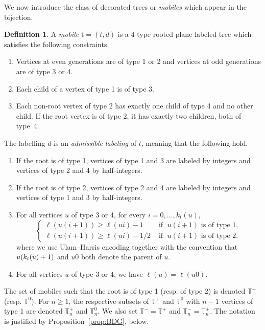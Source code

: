 \documentclass[10pt]{amsart}
\theoremstyle{definition}\newtheorem{defi}[theo]{Definition}\newtheorem{rema}[theo]{Remark}\newtheorem{exam}[theo]{Example}\newtheorem{exem}[theo]{Example}\newtheorem{nota}[theo]{Notation}
\newcommand{\bbT}{\mathbb{T}}
\newcommand{\rt}{\mathrm{t}}
\newcommand*{\romanenumi}{\renewcommand*{\theenumi}{\roman{enumi}}}
\begin{document}
We now introduce the class of decorated trees or \emph{mobiles} which appear in the bijection.

\begin{defi}\label{def:mobiles}
A \emph{mobile} $\rt=(t,d)$ is a 4-type rooted plane labeled tree which satisfies the following constraints.
\begin{enumerate}\romanenumi
\item \label{defi4.2.i} Vertices at even generations are of type 1 or 2 and vertices at odd generations are of type 3 or 4.
\item \label{defi4.2.ii} Each child of a vertex of type 1 is of type 3.
\item \label{defi4.2.iii} Each non-root vertex of type 2 has exactly one child of type 4 and no other child. If the root vertex is of type 2, it has exactly two children, both of type~4.
\end{enumerate}
The labelling $d$ is an \emph{admissible labeling} of $t$, meaning that the following hold.
\begin{enumerate}
\item \label{defi4.2.1} If the root is of type 1, vertices of type 1 and 3 are labeled by integers and vertices of type 2 and 4 by half-integers.
\item \label{defi4.2.2} If the root is of type 2, vertices of type 2 and 4 are labeled by integers and vertices of type 1 and 3 by half-integers.
\item \label{defi4.2.3} For all vertices $u$ of type 3 or 4, for every $i=0,\ldots,k_t(u)$,
\[
\begin{cases}
\ell(u(i+1))\geq \ell(ui)-1& \text{ if }\;u(i+1) \text{ is of type 1},\\
\ell(u(i+1))\geq \ell(ui)-1/2& \text{ if }\;u(i+1) \text{ is of type 2}.
\end{cases}
\]
where we use Ulam--Harris encoding together with the convention that $u(k_t(u)\linebreak +1)$ and $u0$ both denote the parent of $u$.
\item \label{defi4.2.4} For all vertices $u$ of type 3 or 4, we have $\ell(u)=\ell(u0)$.
\end{enumerate}
\end{defi}


The set of mobiles such that the root is of type 1 (resp. of type 2) is denoted $\bbT^+$ (resp. $\bbT^0$). For $n\geq 1$, the respective subsets of $\bbT^+$ and $\bbT^0$ with $n-1$ vertices of type 1 are denoted $\bbT_n^+$ and $\bbT^0_n$. We also set $\bbT^-=\bbT^+$ and $\bbT_n^-=\bbT_n^+$. The notation is justified by Proposition~\ref{prop:BDG}, below.
\end{document}
